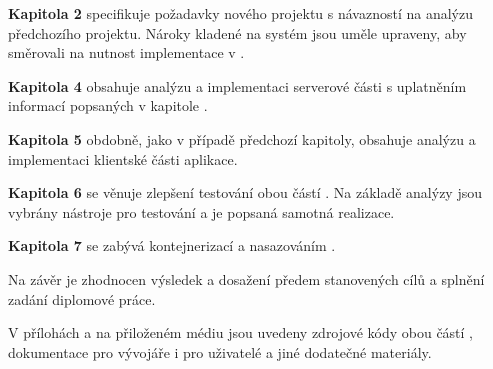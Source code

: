 \textbf{Kapitola 2} specifikuje požadavky nového projektu s návazností na analýzu předchozího projektu.
Nároky kladené na systém jsou uměle upraveny, aby směrovali na nutnost implementace  v .

\textbf{Kapitola 4} obsahuje analýzu a implementaci serverové části  s uplatněním informací popsaných v kapitole .

\textbf{Kapitola 5} obdobně, jako v případě předchozí kapitoly, obsahuje analýzu a implementaci klientské části aplikace.

\textbf{Kapitola 6} se věnuje zlepšení testování obou částí .
Na základě analýzy  jsou vybrány nástroje pro testování a je popsaná samotná realizace.

\textbf{Kapitola 7} se zabývá kontejnerizací a nasazováním .

Na závěr je zhodnocen výsledek a dosažení předem stanovených cílů a splnění zadání diplomové práce.

V přílohách a na přiloženém médiu jsou uvedeny zdrojové kódy obou částí , dokumentace pro vývojáře i pro uživatelé a jiné dodatečné materiály.


